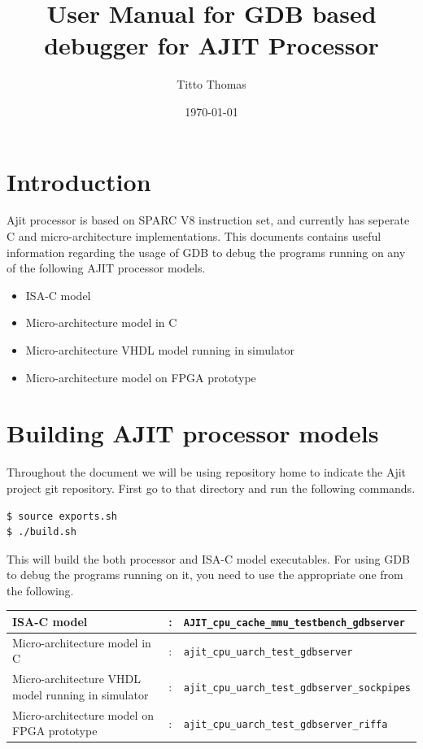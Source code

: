 \documentclass[a4paper, 11pt]{article}
\title{User Manual for GDB based debugger for AJIT Processor}
\author{Titto Thomas}
\date{\today}
\begin{document}
\maketitle

\section{Introduction}
Ajit processor is based on SPARC V8 instruction set, and currently has seperate C and micro-architecture implementations. This documents contains useful information regarding the usage of GDB to debug the programs running on any of the following AJIT processor models.
\begin{itemize}
	\item ISA-C model
	\item Micro-architecture model in C
	\item Micro-architecture VHDL model running in simulator
	\item Micro-architecture model on FPGA prototype
\end{itemize}

\section{Building AJIT processor models}
Throughout the document we will be using repository home to indicate the Ajit project git repository. First go to that directory and run the following commands.

\begin{lstlisting}[language=bash]
$ source exports.sh
$ ./build.sh
\end{lstlisting}
This will build the both processor and ISA-C model executables. For using GDB to debug the programs running on it, you need to use the appropriate one from the following.

\vspace*{5mm}

\begin{tabular}{L{4cm} C{5mm} L{10cm}}
	\hline
	ISA-C model & : & \texttt{AJIT\_cpu\_cache\_mmu\_testbench\_gdbserver}\\ \hline
	Micro-architecture model in C & : & \texttt{ajit\_cpu\_uarch\_test\_gdbserver}\\ \hline
	Micro-architecture VHDL model running in simulator & : & \texttt{ajit\_cpu\_uarch\_test\_gdbserver\_sockpipes}\\ \hline
	Micro-architecture model on FPGA prototype & : & \texttt{ajit\_cpu\_uarch\_test\_gdbserver\_riffa}\\ \hline
\end{tabular}
\end{document}
